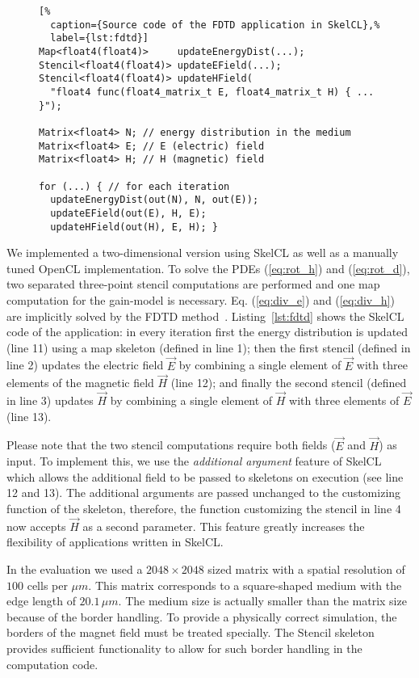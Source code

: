 \begin{figure}[tbp]
\begin{lstlisting}[%
  caption={Source code of the FDTD application in SkelCL},%
  label={lst:fdtd}]
Map<float4(float4)>     updateEnergyDist(...);
Stencil<float4(float4)> updateEField(...);
Stencil<float4(float4)> updateHField(
  "float4 func(float4_matrix_t E, float4_matrix_t H) { ... }");

Matrix<float4> N; // energy distribution in the medium
Matrix<float4> E; // E (electric) field
Matrix<float4> H; // H (magnetic) field

for (...) { // for each iteration
  updateEnergyDist(out(N), N, out(E));  
  updateEField(out(E), H, E);
  updateHField(out(H), E, H); }
\end{lstlisting}
\end{figure}

We implemented a two-dimensional version using SkelCL as well as a manually tuned OpenCL implementation.
To solve the PDEs (\ref{eq:rot_h}) and (\ref{eq:rot_d}), two separated three-point stencil computations are performed and one map computation for the gain-model is necessary.
Eq. (\ref{eq:div_e}) and (\ref{eq:div_h}) are implicitly solved by the FDTD method~\cite{Yee1966}.
Listing~\ref{lst:fdtd} shows the SkelCL code of the application:
in every iteration first the energy distribution is updated (line 11) using a map skeleton (defined in line 1);
then the first stencil (defined in line 2) updates the electric field $\vec{E}$ by combining a single element of $\vec{E}$ with three elements of the magnetic field $\vec{H}$ (line 12);
and finally the second stencil (defined in line 3) updates $\vec{H}$ by combining a single element of $\vec{H}$ with three elements of $\vec{E}$ (line 13).

Please note that the two stencil computations require both fields ($\vec{E}$ and $\vec{H}$) as input.
To implement this, we use the \emph{additional argument} feature of SkelCL which allows the additional field to be passed to skeletons on execution (see line 12 and 13).
The additional arguments are passed unchanged to the customizing function of the skeleton, therefore, the function customizing the stencil in line 4 now accepts $\vec{H}$ as a second parameter.
This feature greatly increases the flexibility of applications written in SkelCL.

In the evaluation we used a $2048 \times 2048$ sized matrix with a spatial resolution of $100$ cells per $\mu m$. 
This matrix corresponds to a square-shaped medium with the edge length of $20.1\,\mu m$. 
The medium size is actually smaller than the matrix size because of the border handling. 
To provide a physically correct simulation, the borders of the magnet field must be treated specially.
The Stencil skeleton provides sufficient functionality to allow for such border handling in the computation code.


